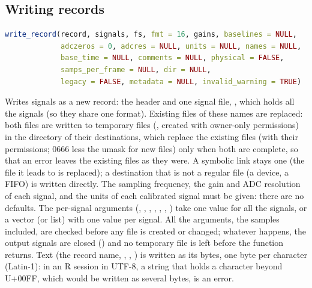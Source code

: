 \subsection{Writing records}
\label{sec:r-writing}

\begin{lstlisting}[language=R,style=signature]
write_record(record, signals, fs, fmt = 16, gains, baselines = NULL,
             adczeros = 0, adcres = NULL, units = NULL, names = NULL,
             base_time = NULL, comments = NULL, physical = FALSE,
             samps_per_frame = NULL, dir = NULL,
             legacy = FALSE, metadata = NULL, invalid_warning = TRUE)
\end{lstlisting}
Writes signals as a new record: the header  and one signal file,
, which holds all the signals (so they share one format). Existing files
of these names are replaced: both files are written to temporary files
(, created with owner-only permissions) in the directory of their
destinations, which replace the existing files (with their permissions; 0666 less the
umask for new files) only when both are complete, so that an error leaves the existing
files as they were. A symbolic link stays one (the file it leads to is replaced); a
destination that is not a regular file (a device, a FIFO) is written directly. The
sampling frequency, the gain and ADC resolution of
each signal, and the units of each calibrated signal must be given: there are no
defaults. The per-signal arguments (, , ,
, , , ) take one value for all the
signals, or a vector (or list) with one value per signal. All the arguments, the samples
included, are checked before any file is created or changed; whatever happens, the output
signals are closed () and no temporary file is left before the function
returns. Text (the record name, , , ) is written as
its bytes, one byte per character (Latin-1): in an R session in UTF-8, a string that holds
a character beyond U+00FF, which would be written as several bytes, is an error.
